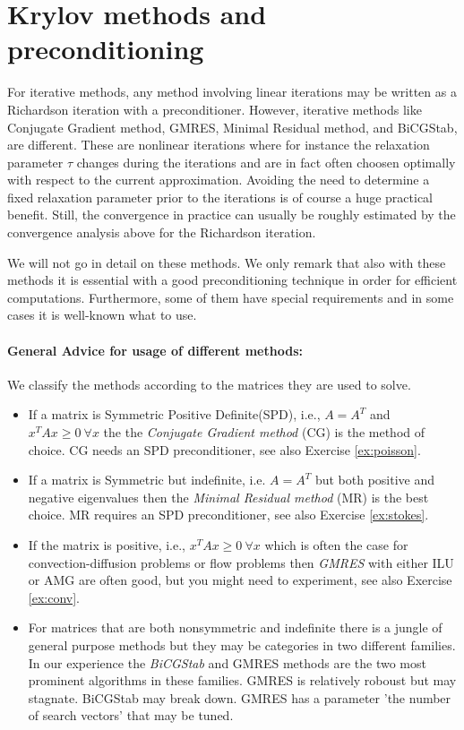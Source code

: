 \section{Krylov methods and preconditioning}
For iterative methods, any method involving linear iterations  may be written as a Richardson iteration with a preconditioner.
However, iterative methods like Conjugate Gradient method, GMRES, Minimal Residual method, and
BiCGStab, are different. These are nonlinear iterations  where 
for instance the relaxation parameter $\tau$ changes during the iterations  
and are in fact often choosen optimally with respect to the current approximation.  
Avoiding the need to determine a fixed relaxation parameter prior to the iterations 
is of course a huge practical benefit. Still, the convergence in practice can 
usually be roughly estimated by the convergence analysis above for the Richardson iteration.   

We will not go in detail on these methods. We only remark that also
with these methods it is essential with a good preconditioning technique in
order for efficient computations.  Furthermore, some of them have special requirements 
and in some cases it is well-known what to use.   

\paragraph{General Advice for usage of different methods:}
We classify the methods according to the matrices they are used to solve.
\begin{itemize}
\item If a matrix is Symmetric Positive Definite(SPD), i.e., $A=A^T$ and $x^T A x \ge 0 \ \forall x$ the
the  \textit{Conjugate Gradient method} (CG) is the method of choice. CG needs an SPD preconditioner, see also Exercise \ref{ex:poisson}. 
\item If a matrix is Symmetric but indefinite, i.e. $A=A^T$ but both positive and negative eigenvalues then 
the  \textit{Minimal Residual method} (MR) is the best choice. MR requires an SPD preconditioner, see also Exercise \ref{ex:stokes}.  
\item If the matrix is positive, i.e., $x^T A x \ge 0 \ \forall x$ which is often the case
for convection-diffusion problems or flow problems then \textit{GMRES} with either ILU or AMG 
are often good, but you might need to experiment, see also Exercise \ref{ex:conv}. 
\item For matrices that are both nonsymmetric and indefinite there is a jungle of  
general purpose methods but they may be categories in two different families. 
In our experience the \textit{BiCGStab} and GMRES methods are the two most prominent algorithms 
in these families. GMRES is relatively roboust but may stagnate. BiCGStab may break down.    
GMRES has a parameter 'the number of search vectors' that may be tuned. 
\end{itemize}

